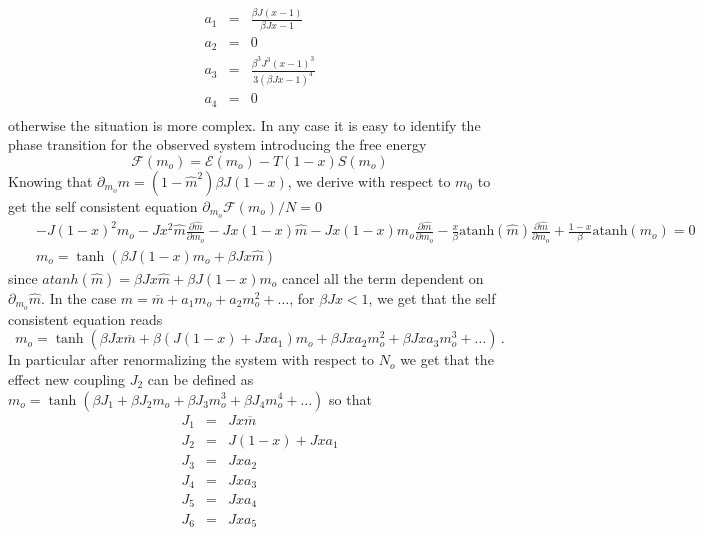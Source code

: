 \documentclass[aps,pre,noshowpacs]{revtex4}
\begin{document}
\begin{eqnarray}
a_1&=& \frac{\beta  J (x-1)}{\beta  J x-1}\nonumber \\
a_2 &=& 0 \nonumber\\
a_3 &=& \frac{\beta ^3 J^3 (x-1)^3}{3 (\beta  J x-1)^4}\nonumber\\
a_4 &=& 0\nonumber\\
\end{eqnarray}
otherwise the situation is more complex.
In any case it is easy to identify the phase transition for the observed system introducing the free energy
\begin{equation}
\mathcal{F}(m_o)=\mathcal{E}(m_o)-T (1-x) S(m_o)
\end{equation}
Knowing that $\partial_{m_o} \hat{m} = (1-\hat{m}^2) \beta J (1-x)$, we derive with respect to $m_0$ to get the self consistent equation $\partial_{m_o} \mathcal {F}(m_o)/N=0$
\begin{eqnarray}
&&- J (1-x)^2 m_o - J x^2 \hat{m}\frac{ \partial \hat{m}}{\partial m_o} - J x (1-x) \hat{m} - J x (1-x) m_o \frac{ \partial \hat{m}}{\partial m_o} - \frac{x}{\beta} \mbox{atanh}(\hat{m}) \frac{ \partial \hat{m}}{\partial m_o} + \frac{1-x}{\beta} \mbox{atanh}(m_o)=0\nonumber\\
 &&m_o= \tanh\left(\beta J (1-x) m_o + \beta J x \hat{m}\right) 
\end{eqnarray}
since $atanh(\hat{m})=\beta J x \hat{m} + \beta J (1-x) m_o$ cancel all the term dependent on $\partial_{m_o} \hat{m}$. 
In the case $\hat{m}=\overline{m} + a_1 m_o + a_2 m_o^2 + \ldots $, for $\beta J x <1$, we get that the self consistent equation reads
$$ m_o=\tanh\left(\beta J x \overline{m}+ \beta (J (1-x) +J x a_1 ) m_o + \beta J x a_2 m_o^2 + \beta J x a_3 m_o^3 + \ldots \right)\,.$$ In particular after renormalizing the system with respect to $N_o$ we get that the effect new coupling $J_2$ can be defined as
$m_o=\tanh( \beta J_1 + \beta J_2 m_o + \beta J_3 m_o^3 + \beta J_4 m_o^4 +\ldots)$ so that 
\begin{eqnarray}\label{renJ1hT}
J_1&=& J x \overline{m} \nonumber\\
J_2&=&  J(1-x) + Jx a_1\nonumber\\
J_3&=&Jx a_2\nonumber\\
J_4&=& J xa_3\nonumber\\
J_5&=&Jx a_4\nonumber\\
J_6&=&Jx a_5\nonumber\\
\end{eqnarray}
\end{document}
